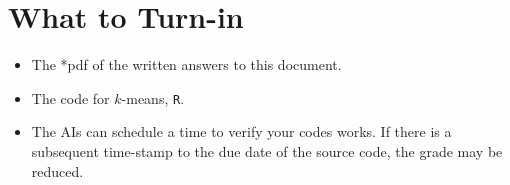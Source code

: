 \documentclass{article}
\begin{document}
\section*{What to Turn-in}
\begin{itemize}
\item The *pdf of the written answers to this document.
\item The code for $k$-means, \texttt{R}.
\item The AIs can schedule a time to verify your codes works.  If there is a subsequent time-stamp to the due date of the source code, the grade may be reduced.  
\end{itemize}
 

\end{document}
